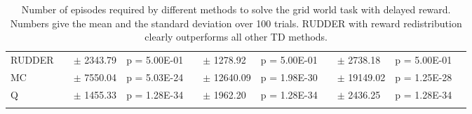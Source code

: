\documentclass{article}
\begin{document}
\begin{appendices}
\newpage
\begin{landscape}
\begin{table}[htp]
\begin{flushleft}
\caption{Number of episodes required by different 
 methods to solve the grid world task with delayed reward. Numbers give the  
 mean and the standard deviation over 100 trials.
 RUDDER with reward redistribution clearly outperforms all other TD methods.}
\label{tab:res1}\begin{tabular}{*{1}{>{\raggedright}p{6em}}*{1}{>{\columncolor{mColor1}\raggedleft}p{4em}}*{1}{>{\columncolor{mColor1}\raggedleft}p{5em}}*{1}{>{\columncolor{mColor1}\raggedright}p{5em}}*{1}{>{\raggedleft}p{4em}}*{1}{>{\raggedleft}p{5em}}*{1}{>{\raggedright}p{5em}}*{1}{>{\columncolor{mColor1}\raggedleft}p{4em}}*{1}{>{\columncolor{mColor1}\raggedleft}p{5em}}*{1}{>{\columncolor{mColor1}\raggedright}p{5em}}*{1}{>{\raggedright}p{0.01em}}}
\toprule[1pt]
\addlinespace[2pt]
{\bf Method} &\multicolumn{3}{c}{\bf Delay 10} &\multicolumn{3}{c}{\bf Delay 15} &\multicolumn{3}{c}{\bf Delay 20} &\\
\toprule[1pt]
RUDDER & 3520.06 & {\small $\pm$ 2343.79} & {\small p = 5.00E-01} & 3062.07 & {\small $\pm$ 1278.92} & {\small p = 5.00E-01} & 3813.96 & {\small $\pm$ 2738.18} & {\small p = 5.00E-01} &  \\
MC & 10920.64 & {\small $\pm$ 7550.04} & {\small p = 5.03E-24} & 17102.89 & {\small $\pm$ 12640.09} & {\small p = 1.98E-30} & 22910.85 & {\small $\pm$ 19149.02} & {\small p = 1.25E-28} &  \\
Q & 66140.76 & {\small $\pm$ 1455.33} & {\small p = 1.28E-34} & 115352.25 & {\small $\pm$ 1962.20} & {\small p = 1.28E-34} & 171571.94 & {\small $\pm$ 2436.25} & {\small p = 1.28E-34} &  \\
\addlinespace[1pt]

\end{tabular}
\end{flushleft}


\end{table}
\end{landscape}
\end{appendices}
\end{document}
